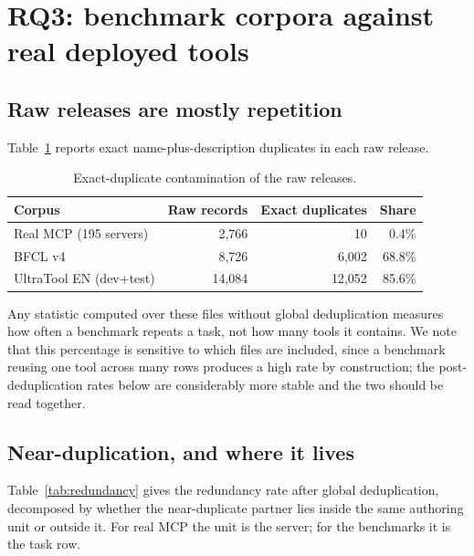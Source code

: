 \documentclass[11pt]{article}
\begin{document}
\section{RQ3: benchmark corpora against real deployed tools}
\label{sec:redundancy}

\subsection{Raw releases are mostly repetition}
Table~\ref{tab:exact} reports exact name-plus-description duplicates in each raw
release.

\begin{table}[h]
\centering
\begin{tabular}{lrrr}
\toprule
Corpus & Raw records & Exact duplicates & Share \\
\midrule
Real MCP (195 servers)   & 2{,}766  & 10     & 0.4\%  \\
BFCL v4                  & 8{,}726  & 6{,}002  & 68.8\% \\
UltraTool EN (dev+test)  & 14{,}084 & 12{,}052 & 85.6\% \\
\bottomrule
\end{tabular}
\caption{Exact-duplicate contamination of the raw releases.}
\label{tab:exact}
\end{table}

Any statistic computed over these files without global deduplication measures how
often a benchmark repeats a task, not how many tools it contains. We note that
this percentage is sensitive to which files are included, since a benchmark
reusing one tool across many rows produces a high rate by construction; the
post-deduplication rates below are considerably more stable and the two should be
read together.

\subsection{Near-duplication, and where it lives}
Table~\ref{tab:redundancy} gives the redundancy rate after global deduplication,
decomposed by whether the near-duplicate partner lies inside the same authoring
unit or outside it. For real MCP the unit is the server; for the benchmarks it is
the task row.
\end{document}
